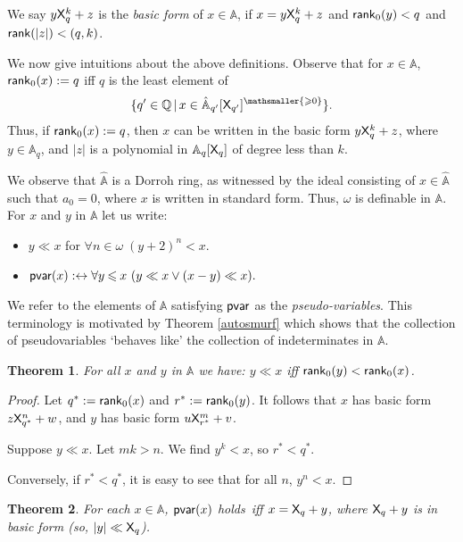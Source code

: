 \documentclass{amsart}
\renewcommand{\iff}{\leftrightarrow}
\renewcommand{\leq}{\leqslant}
\renewcommand{\geq}{\geqslant}
\newtheorem{theorem}{Theorem}[section]
\newcommand{\bleq}{\mathbin{\leq}}
\newcommand{\bin}{\mathbin{\in}}
\newcommand{\X}{{\sf X}}
\newcommand{\psv}{{\sf pvar}}
\newcommand{\psvar}{pseudo-variables}
\begin{document}
 We say $y\X_q^k+z$ is the \emph{basic form} of $x\in\mathbb{A}$, if 
 $x=y\X_q^k+z$ and ${\sf rank}_0(y) < q$ and ${\sf rank}(|z|)<(q,k)$.

We now give intuitions about the above definitions. Observe that for $x\in\mathbb{A}$, ${\sf rank}_0(x) := q$ iff $q$ is the 
least element of $$\{q'\in \mathbb{Q}  \mathop\mid x\in \hat{\mathbb{A}}_{q'} [\X_{q'}]^{\mathsmaller{\geq 0}}\}.$$  
Thus, if ${\sf rank}_0(x) := q$, then $x$ can be written in the basic form $y\X_q^k+z$, where 
$y\in \mathbb{A}_{q}$, and $|z|$ is a polynomial in $\mathbb{A}_q [\X_q]$ of degree less than $k$. 

We observe that $\hat{\mathbb{A}}$ is a Dorroh ring, as witnessed by the ideal consisting of $x\in \hat{\mathbb{A}}$ such that $a_0 = 0$, where $x$ is written in standard form. 
Thus, $\omega$ is definable in $\mathbb{A}$. For $x$ and $y$ in $\mathbb{A}$ let us write:
\begin{itemize}
\item
  $y \ll x$ for $\forall n\bin \omega \; (y+2)^n< x$.
\item
$\psv(x) :\iff \forall y \bleq x ~ (y\ll x\vee(x-y) \ll x).$
\end{itemize}
We refer to the elements of $\mathbb{A}$ satisfying $\psv$ as the \emph{\psvar}. This terminology is motivated by 
Theorem \ref{autosmurf} which shows that the collection of pseudovariables `behaves like' the collection of indeterminates in $\mathbb{A}$.

\begin{theorem}
For all $x$ and $y$ in $\mathbb{A}$ we have: $y \ll x$ iff ${\sf rank}_0(y) < {\sf rank}_0(x)$.
\end{theorem} 

\begin{proof}
Let $q^\ast := {\sf rank}_0(x)$ and
$r^\ast:= {\sf rank}_0(y)$. 
It follows that $x$ has basic form $z\X^n_{q^\ast}+w$, 
and $y$ has basic form $u\X^m_{r^\ast}+v$.

Suppose $y \ll x$.
Let $mk > n$.
We find $y^k < x$, so $r^\ast < q^\ast$.

Conversely, if $r^\ast < q^\ast$, it is easy to see that for all $n$, $y^n < x$.
\end{proof}

\begin{theorem}\label{gargamel}
For each $x\in\mathbb{A}$, $\psv(x)$ holds\ iff $x= \X_q+y$, where $\X_q+y$ is in basic form 
\textup(so, $|y| \ll \X_q$\textup).
\end{theorem}
\end{document}
